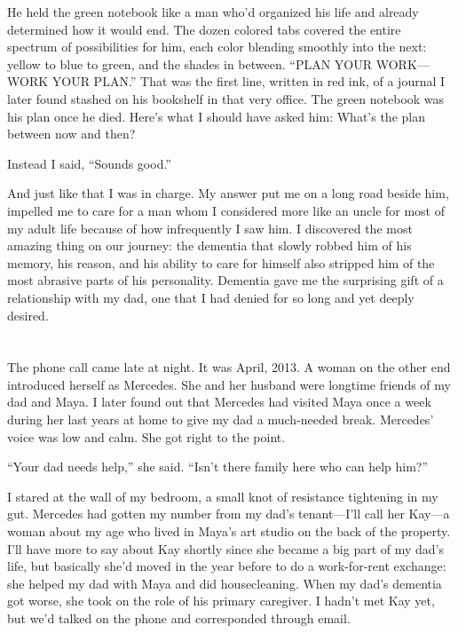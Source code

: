 \documentclass[12pt]{book}
\begin{document}
He held the green notebook like a man who'd organized his life and already determined how it would end. The dozen colored tabs covered the entire spectrum of possibilities for him, each color blending smoothly into the next: yellow to blue to green, and the shades in between. ``PLAN YOUR WORK---WORK YOUR PLAN.'' That was the first line, written in red ink, of a journal I later found stashed on his bookshelf in that very office. The green notebook was his plan once he died. Here's what I should have asked him: What's the plan between now and then?

Instead I said, ``Sounds good.''

And just like that I was in charge. My answer put me on a long road beside him, impelled me to care for a man whom I considered more like an uncle for most of my adult life because of how infrequently I saw him. I discovered the most amazing thing on our journey: the dementia that slowly robbed him of his memory, his reason, and his ability to care for himself also stripped him of the most abrasive parts of his personality. Dementia gave me the surprising gift of a relationship with my dad, one that I had denied for so long and yet deeply desired. 

\mainmatter
\part{}
\chapter{}

The phone call came late at night. It was April, 2013. A woman on the other end introduced herself as Mercedes. She and her husband were longtime friends of my dad and Maya. I later found out that Mercedes had visited Maya once a week during her last years at home to give my dad a much-needed break. Mercedes' voice was low and calm. She got right to the point.

``Your dad needs help,'' she said. ``Isn't there family here who can help him?''

I stared at the wall of my bedroom, a small knot of resistance tightening in my gut. Mercedes had gotten my number from my dad's tenant---I'll call her Kay---a woman about my age who lived in Maya's art studio on the back of the property. I'll have more to say about Kay shortly since she became a big part of my dad's life, but basically she'd moved in the year before to do a work-for-rent exchange: she helped my dad with Maya and did housecleaning. When my dad's dementia got worse, she took on the role of his primary caregiver. I hadn't met Kay yet, but we'd talked on the phone and corresponded through email.
\end{document}
